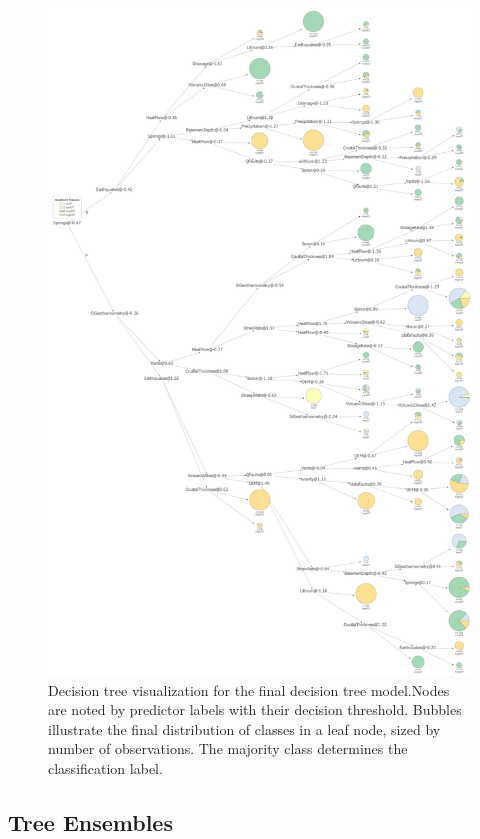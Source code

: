 \begin{figure}[!htp]
\centering
\includegraphics[height=0.9\textheight,keepaspectratio]{templates/images/Figure-DT_viz_portrait.pdf}
\caption[Decision tree visualization]{Decision tree visualization for the final decision tree model.Nodes are noted by predictor labels with their decision threshold. Bubbles illustrate the final distribution of classes in a leaf node, sized by number of observations. The majority class determines the classification label.}
\label{fig:dtree_viz}
\end{figure}

\subsection{Tree Ensembles}

